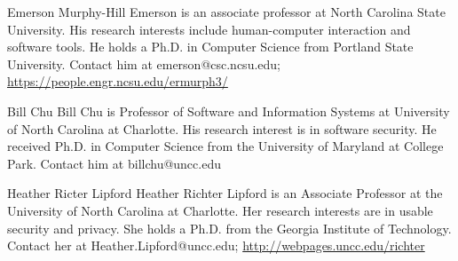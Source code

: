 \documentclass[10pt,journal,compsoc]{IEEEtran}
\begin{document}
\begin{IEEEbiography}{Emerson Murphy-Hill}
	Emerson is an associate professor at North Carolina State University. His research interests include human-computer interaction and software tools. He holds a Ph.D. in Computer Science from Portland State University. 
	Contact him at emerson@csc.ncsu.edu; \url{https://people.engr.ncsu.edu/ermurph3/}
	
\end{IEEEbiography}

\begin{IEEEbiography}{Bill Chu}
	Bill Chu is  Professor of Software and Information Systems at University of North Carolina at Charlotte. His research interest is in software security. He received  Ph.D. in Computer Science from the University of Maryland at College Park. 
	Contact him at billchu@uncc.edu
\end{IEEEbiography}

\begin{IEEEbiography}{Heather Ricter Lipford}
	Heather Richter Lipford is an Associate Professor at the University of
	North Carolina at Charlotte. Her research interests are in usable
	security and privacy. She holds a Ph.D. from the Georgia Institute of
	Technology. 
	Contact her at Heather.Lipford@uncc.edu;
	\url{http://webpages.uncc.edu/richter}
\end{IEEEbiography}
\end{document}
